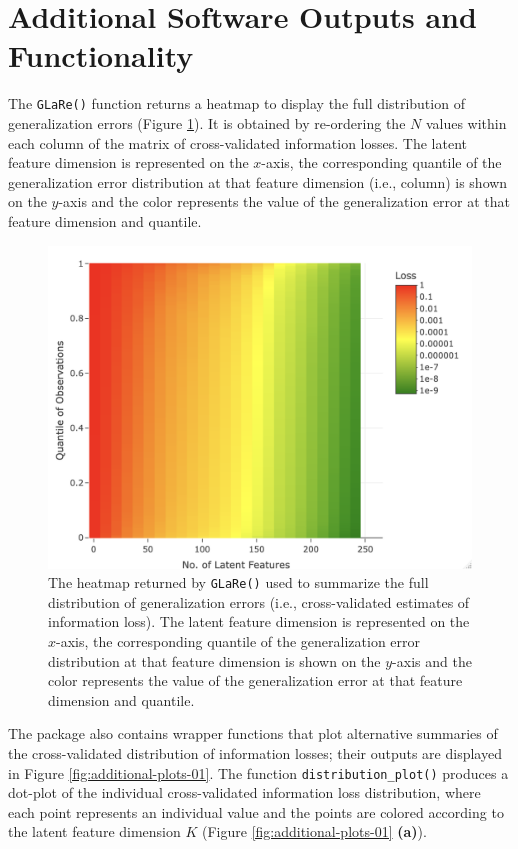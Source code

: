 \section{Additional Software Outputs and Functionality}\label{sec:additional-outputs}


The \texttt{GLaRe()} function returns a heatmap to display the full distribution of generalization errors (Figure \ref{fig:eye-heatmap}).
It is obtained by re-ordering the $N$ values within each column of the matrix of cross-validated information losses.
The latent feature dimension is represented on the $x$-axis, the corresponding quantile of the generalization error distribution at that feature dimension (i.e., column) is shown on the $y$-axis and the color represents the value of the generalization error at that feature dimension and quantile.


\begin{figure}
    \centering
    \includegraphics[width=0.75\linewidth]{figures/eye-heatmap.png}
    \caption{The heatmap returned by \texttt{GLaRe()} used to summarize the full distribution of generalization errors (i.e., cross-validated estimates of information loss). The latent feature dimension is represented on the $x$-axis, the corresponding quantile of the generalization error distribution at that feature dimension is shown on the $y$-axis and the color represents the value of the generalization error at that feature dimension and quantile.}
    \label{fig:eye-heatmap}
\end{figure}

The  package also contains wrapper functions that plot alternative summaries of the cross-validated distribution of information losses; their outputs are displayed in Figure \ref{fig:additional-plots-01}.
The function \texttt{distribution\_plot()} produces a dot-plot of the individual cross-validated information loss distribution, where each point represents an individual value and the points are colored according to the latent feature dimension $K$ (Figure \ref{fig:additional-plots-01} \textbf{(a)}).

